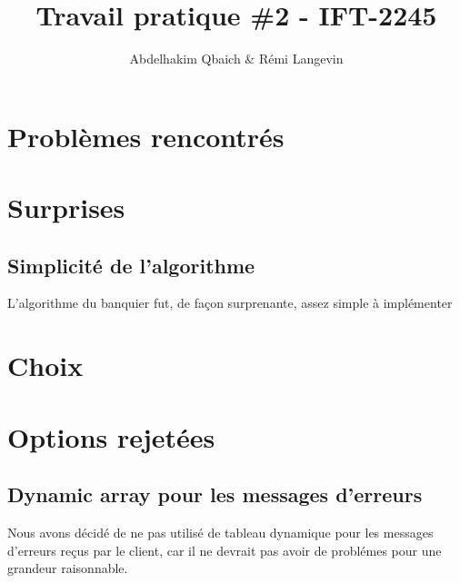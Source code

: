 \documentclass[11pt]{article}
\title{Travail pratique \#2 - IFT-2245}
\author{Abdelhakim Qbaich & R\'emi Langevin}
\begin{document}
\maketitle

\section*{Probl\`emes rencontr\'es}
\subsection*{}

\section*{Surprises}
\subsection*{Simplicit\'e de l'algorithme}
L'algorithme du banquier fut, de fa\c{c}on surprenante, assez simple \`a 
impl\'ementer
\section*{Choix}

\section*{Options rejet\'ees}

\subsection*{Dynamic array pour les messages d'erreurs}
Nous avons d\'ecid\'e de ne pas utilis\'e de tableau dynamique pour les messages
d'erreurs re\c{c}us par le client, car il ne devrait pas avoir de probl\'emes
pour une grandeur raisonnable.
\end{document}
